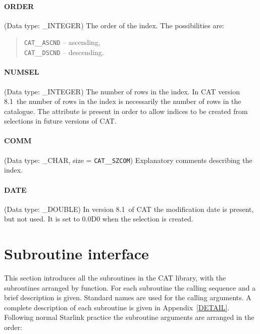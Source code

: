 \documentclass[11pt,twoside]{starlink}
\providecommand{\CATversion}{8.1~}
\begin{document}
\paragraph{ORDER}
(Data type: \_INTEGER)
The order of the index. The possibilities are:

\begin{verse}
\texttt{CAT\_\_ASCND} -- ascending,  \\
\texttt{CAT\_\_DSCND} -- descending.
\end{verse}

\paragraph{NUMSEL}
(Data type: \_INTEGER)
The number of rows in the index. In CAT version \CATversion the number
of rows in the index is necessarily the number of rows in the catalogue.
The attribute is present in order to allow indices to be created from
selections in future versions of CAT.

\paragraph{COMM}
(Data type: \_CHAR, size = \texttt{CAT\_\_SZCOM})
Explanatory comments describing the index.

\paragraph{DATE}
(Data type: \_DOUBLE)
In version \CATversion of CAT the modification date is present, but
not used. It is set to 0.0D0 when the selection is created.


\section{\label{SUBINT}Subroutine interface}


% 



This section introduces all the subroutines in the CAT library, with the
subroutines arranged by function. For each subroutine the calling
sequence and a brief description is given. Standard names are used for
the calling arguments. A complete description of each subroutine is
given in Appendix~\ref{DETAIL}. Following normal Starlink practice the
subroutine arguments are arranged in the order:
\end{document}

